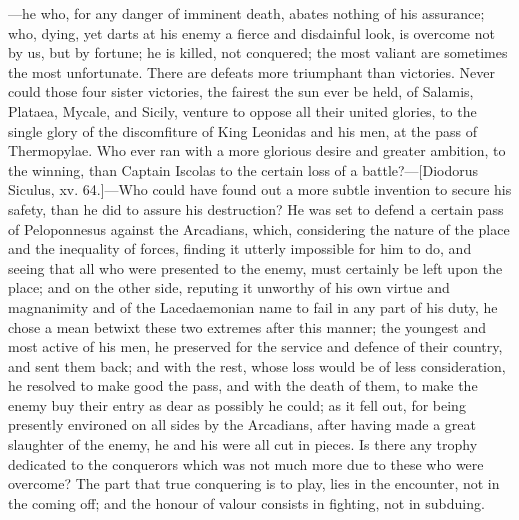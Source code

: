 \documentclass[twocolumn]{article}
\newcommand{\specialbreak}{\newpage\noindent}
\begin{document}
\noindent{}---he who, for any danger of imminent death, abates nothing of his assurance; who, dying, yet darts at his enemy a fierce and disdainful look, is overcome not by us, but by fortune; he is killed, not conquered; the most valiant are sometimes the most unfortunate. There are defeats more triumphant than victories. Never could those four sister victories, the fairest the sun ever be held, of Salamis, Plataea, Mycale, and Sicily, venture to oppose all their united glories, to the single glory of the discomfiture of King Leonidas and his men, at the pass of Thermopylae. Who ever ran with a more glorious desire and greater ambition, to the winning, than Captain \specialbreak Iscolas to the certain loss of a battle?---[Diodorus Siculus, xv. 64.]---Who could have found out a more subtle invention to secure his safety, than he did to assure his destruction? He was set to defend a certain pass of Peloponnesus against the Arcadians, which, considering the nature of the place and the inequality of forces, finding it utterly impossible for him to do, and seeing that all who were presented to the enemy, must certainly be left upon the place; and on the other side, reputing it unworthy of his own virtue and magnanimity and of the Lacedaemonian name to fail in any part of his duty, he chose a mean betwixt these two extremes after this manner; the youngest and most active of his men, he preserved for the service and defence of their country, and sent them back; and with the rest, whose loss would be of less consideration, he resolved to make good the pass, and with the death of them, to make the enemy buy their entry as dear as possibly he could; as it fell out, for being presently environed on all sides by the Arcadians, after having made a great slaughter of the enemy, he and his were all cut in pieces. Is there any trophy dedicated to the conquerors which was not much more due to these who were overcome? The part that true conquering is to play, lies in the encounter, not in the coming off; and the honour of valour consists in fighting, not in subduing.
\end{document}

